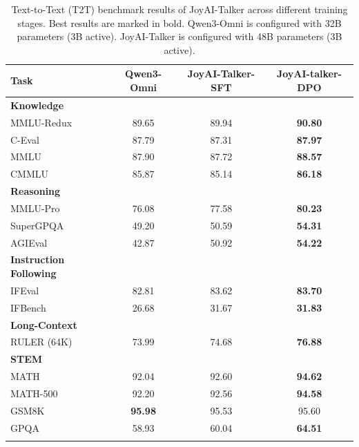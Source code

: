 \begin{table}[ht]
\centering
\caption{Text-to-Text (T2T) benchmark results of JoyAI-Talker across different training stages. Best results are marked in bold. Qwen3-Omni is configured with 32B parameters (3B active). JoyAI-Talker is configured with 48B parameters (3B active).}
\label{tab:instruct_eval}
\begin{tabular}{lccc}
\toprule
\textbf{Task} & \textbf{Qwen3-Omni} & \textbf{JoyAI-Talker-SFT} & \textbf{JoyAI-talker-DPO}  \\
\midrule
\rowcolor[gray]{0.92} \textbf{Knowledge} & & & \\
\quad MMLU-Redux & 89.65 & 89.94 & \textbf{90.80} \\
\quad C-Eval & 87.79 & 87.31 & \textbf{87.97} \\
\quad MMLU & 87.90 & 87.72 & \textbf{88.57} \\
\quad CMMLU & 85.87 & 85.14 & \textbf{86.18} \\
\hline
\rowcolor[gray]{0.92} \textbf{Reasoning} & & & \\
\quad MMLU-Pro & 76.08 & 77.58 & \textbf{80.23}\\
\quad SuperGPQA & 49.20 & 50.59 & \textbf{54.31}\\
\quad AGIEval & 42.87 & 50.92 & \textbf{54.22}\\
\hline
\rowcolor[gray]{0.92} \textbf{Instruction Following} & & & \\
\quad IFEval & 82.81 & 83.62 & \textbf{83.70}\\
\quad IFBench & 26.68 & 31.67 & \textbf{31.83}\\
\hline
\rowcolor[gray]{0.92} \textbf{Long-Context} & & & \\
\quad RULER (64K) & 73.99 & 74.68 & \textbf{76.88}\\
\hline
\rowcolor[gray]{0.92} \textbf{STEM} & & & \\
\quad MATH & 92.04 & 92.60 & \textbf{94.62}\\
\quad MATH-500 & 92.20 & 92.56 & \textbf{94.58}\\
\quad GSM8K & \textbf{95.98} & 95.53 & 95.60\\
\quad GPQA & 58.93 & 60.04 & \textbf{64.51} \\
\bottomrule
\vspace{5pt}

\end{tabular}
\end{table}






